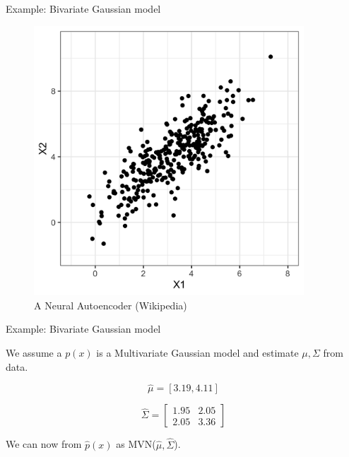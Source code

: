 \documentclass[10pt]{beamer}
\begin{document}
\begin{frame}{Example: Bivariate Gaussian model}

\begin{figure}[h]
\centering
\includegraphics[width=0.9\textwidth]{fig/bi_data.png}
\caption{A Neural Autoencoder (Wikipedia)}
\end{figure}

\end{frame}

\begin{frame}{Example: Bivariate Gaussian model}

We assume a $p(x)$ is a Multivariate Gaussian model and estimate $\mu,\Sigma$ from data.
\pause

\[
\hat{\mu} = [3.19, 4.11]
\]

\[
\hat{\Sigma} = \begin{bmatrix} 1.95 & 2.05\\ 2.05 & 3.36 \end{bmatrix}
\]

We can now  from $\hat{p}(x)$ as MVN($\hat{\mu},\hat{\Sigma}$).

\end{frame}
\end{document}
